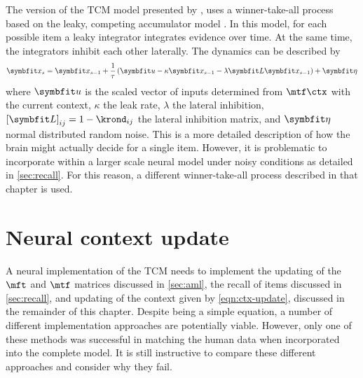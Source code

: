 The version of the TCM model presented by \textcite{Sederberg2008}, uses a winner-take-all process based on the leaky, competing accumulator model \parencite{Usher2001}.
In this model, for each possible item a leaky integrator integrates evidence over time.
At the same time, the integrators inhibit each other laterally.
The dynamics can be described by
\begin{equation}
    \vc x_s = \vc x_{s - 1} + \frac{1}{\tau} \del{\vc u - \kappa \vc x_{s - 1} - \lambda \mat L \vc x_{s - 1}} + \vc\eta
\end{equation}
where $\vc u$ is the scaled vector of inputs determined from $\mtf \ctx$ with the current context, $\kappa$ the leak rate, $\lambda$ the lateral inhibition, ${[\mat L]}_{ij} = 1 - \krond_{ij}$ the lateral inhibition matrix, and $\vc\eta$ normal distributed random noise.
This is a more detailed description of how the brain might actually decide for a single item.
However, it is problematic to incorporate within a larger scale neural model under noisy conditions as detailed in \cref{sec:recall}.
For this reason, a different winner-take-all process described in that chapter is used.


\section{Neural context update}\label{sec:ctx-update}
A neural implementation of the TCM needs to implement the updating of the $\mft$ and $\mtf$ matrices discussed in \cref{sec:aml}, the recall of items discussed in \cref{sec:recall}, and updating of the context given by \cref{eqn:ctx-update}, discussed in the remainder of this chapter.
Despite being a simple equation, a number of different implementation approaches are potentially viable.
However, only one of these methods was successful in matching the human data when incorporated into the complete model.
It is still instructive to compare these different approaches and consider why they fail.

